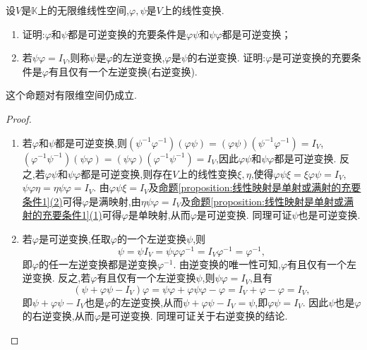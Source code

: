 \documentclass[../../main.tex]{subfiles}%
\begin{document}
\begin{proposition}\label{proposition:无限维线性空间的可逆线性变换充要条件1}
设\(V\)是\(\mathbb{K}\)上的无限维线性空间,\(\varphi,\psi\)是\(V\)上的线性变换.
\begin{enumerate}[(1)]
\item 证明:\(\varphi\)和\(\psi\)都是可逆变换的充要条件是\(\varphi\psi\)和\(\psi\varphi\)都是可逆变换；

\item 若\(\psi\varphi = I_V\),则称\(\psi\)是\(\varphi\)的左逆变换,\(\varphi\)是\(\psi\)的右逆变换. 证明:\(\varphi\)是可逆变换的充要条件是\(\varphi\)有且仅有一个左逆变换(右逆变换).
\end{enumerate}
\end{proposition}
\begin{note}
这个命题对有限维空间仍成立.
\end{note}
\begin{proof}
\begin{enumerate}[(1)]
\item 若\(\varphi\)和\(\psi\)都是可逆变换,则\((\psi^{-1}\varphi^{-1})(\varphi\psi)=(\varphi\psi)(\psi^{-1}\varphi^{-1}) = I_V\),\((\varphi^{-1}\psi^{-1})(\psi\varphi)=(\psi\varphi)(\varphi^{-1}\psi^{-1}) = I_V\),因此\(\varphi\psi\)和\(\psi\varphi\)都是可逆变换. 反之,若\(\varphi\psi\)和\(\psi\varphi\)都是可逆变换,则存在\(V\)上的线性变换\(\xi,\eta\),使得\(\varphi\psi\xi=\xi\varphi\psi = I_V\),\(\psi\varphi\eta=\eta\psi\varphi = I_V\). 由\(\varphi\psi\xi = I_V\)及\hyperref[proposition:线性映射是单射或满射的充要条件1]{命题\ref{proposition:线性映射是单射或满射的充要条件1}(2)}可得\(\varphi\)是满映射,由\(\eta\psi\varphi = I_V\)及\hyperref[proposition:线性映射是单射或满射的充要条件1]{命题\ref{proposition:线性映射是单射或满射的充要条件1}(1)}可得\(\varphi\)是单映射,从而\(\varphi\)是可逆变换. 同理可证\(\psi\)也是可逆变换.

\item 若\(\varphi\)是可逆变换,任取\(\varphi\)的一个左逆变换\(\psi\),则
\[
\psi=\psi I_V=\psi\varphi\varphi^{-1}=I_V\varphi^{-1}=\varphi^{-1},
\]
即\(\varphi\)的任一左逆变换都是逆变换\(\varphi^{-1}\). 由逆变换的唯一性可知,\(\varphi\)有且仅有一个左逆变换. 反之,若\(\varphi\)有且仅有一个左逆变换\(\psi\),则\(\psi\varphi = I_V\),且有
\[
(\psi+\varphi\psi - I_V)\varphi=\psi\varphi+\varphi\psi\varphi-\varphi=I_V+\varphi-\varphi=I_V,
\]
即\(\psi+\varphi\psi - I_V\)也是\(\varphi\)的左逆变换,从而\(\psi+\varphi\psi - I_V=\psi\),即\(\varphi\psi = I_V\). 因此\(\psi\)也是\(\varphi\)的右逆变换,从而\(\varphi\)是可逆变换. 同理可证关于右逆变换的结论.
\end{enumerate}

\end{proof}
\end{document}
